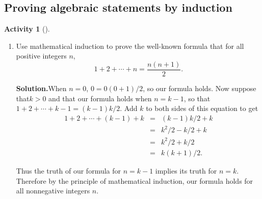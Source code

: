 \documentclass[10pt,]{book}
\theoremstyle{plain}
\theoremstyle{definition}
\newtheorem{activity}[project]{Activity}
\numberwithin{equation}{chapter}
\newcommand{\amp}{&}
\begin{document}
\subsection[{Proving algebraic statements by induction}]{Proving algebraic statements by induction}\label{subsection-75}
\begin{activity}[]\label{activity-332}
~\par
\begin{enumerate}[label=(\alph*)]
 \item Use mathematical induction to prove the well-known formula that for all positive integers \(n\),%
\begin{equation*}
1+2 + \cdots +n = \frac{n(n+1)}{2}.
\end{equation*}
%
\par\medskip\noindent%
\textbf{Solution.}\quad When \(n=0\), \(0=0(0+1)/2\), so our formula holds. Now suppose that\(k>0\) and that our formula holds when \(n=k-1\), so that \(1+2+\cdots+k-1=(k-1)k/2\). Add \(k\) to both sides of this equation to get%
\begin{align*}
1+2+\cdots+(k-1)+k\amp =\amp  (k-1)k/2 +k\\
\amp =\amp  k^2/2-k/2+k\\
\amp =\amp
k^2/2+k/2\\
\amp =\amp k(k+1)/2.
\end{align*}
%
\par
Thus the truth of our formula for \(n=k-1\) implies its truth for \(n=k\). Therefore by the principle of mathematical induction, our formula holds for all nonnegative integers \(n\).%


\end{enumerate}
\end{activity}
\end{document}
